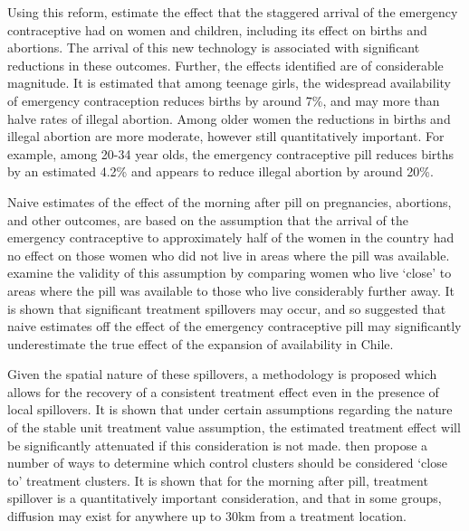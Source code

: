 Using this reform, \Person estimate the effect that the staggered arrival of the 
emergency contraceptive had on women and children, including its effect on births 
and abortions.  The arrival of this new technology is associated with significant 
reductions in these outcomes.  Further, the effects identified are of considerable
magnitude.  It is estimated that among teenage girls, the widespread availability 
of emergency contraception reduces births by around 7\%, and may more than halve 
rates of illegal abortion.  Among older women the reductions in births and illegal 
abortion are more moderate, however still quantitatively important.  For example, 
among 20-34 year olds, the emergency contraceptive pill reduces births by an 
estimated 4.2\% and appears to reduce illegal abortion by around 20\%.

\nocite{Goldin2006, Bailey2011}
\nocite{KearnerLevine2009}
\nocite{Ananatetal2007,ThomasDouglas1996,Levineetal1996}

Naive estimates of the effect of the morning after pill on pregnancies, 
abortions, and other outcomes, are based on the assumption that the arrival of
the emergency contraceptive to approximately half of the women in the country
had no effect on those women who did not live in areas where the pill was
available.  \Person examine the validity of this assumption by comparing women 
who live `close' to areas where the pill was available to those who live
considerably further away.  It is shown that significant treatment spillovers
may occur, and so suggested that naive estimates off the effect of the emergency 
contraceptive pill may significantly underestimate the true effect of the 
expansion of availability in Chile.

Given the spatial nature of these spillovers, a methodology is proposed which
allows for the recovery of a consistent treatment effect even in the presence
of local spillovers.  It is shown that under certain assumptions regarding the
nature of the stable unit treatment value assumption, the estimated treatment 
effect will be significantly attenuated if this consideration is not made.
\Person then propose a number of ways to determine which control clusters should
be considered `close to' treatment clusters.  It is shown that for the morning
after pill, treatment spillover is a quantitatively important consideration,
and that in some groups, diffusion may exist for anywhere up to 30km from a
treatment location.

